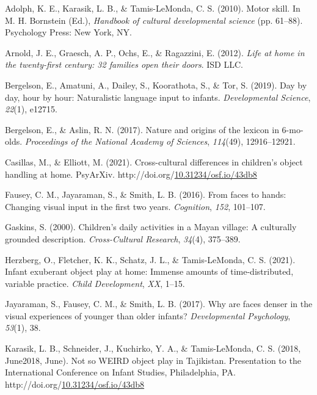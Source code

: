 \documentclass[10pt, letterpaper]{article}
\newenvironment{CSLReferences}%
  {}%
  {\par}
\begin{document}
\noindent

\hypertarget{refs}{}
\begin{CSLReferences}{1}{0}
\leavevmode\hypertarget{ref-adolph2010motor}{}%
Adolph, K. E., Karasik, L. B., \& Tamis-LeMonda, C. S. (2010). Motor
skill. In M. H. Bornstein (Ed.), \emph{Handbook of cultural
developmental science} (pp. 61--88). Psychology Press: New York, NY.

\leavevmode\hypertarget{ref-arnold2012life}{}%
Arnold, J. E., Graesch, A. P., Ochs, E., \& Ragazzini, E. (2012).
\emph{Life at home in the twenty-first century: 32 families open their
doors}. ISD LLC.

\leavevmode\hypertarget{ref-bergelson2019day}{}%
Bergelson, E., Amatuni, A., Dailey, S., Koorathota, S., \& Tor, S.
(2019). Day by day, hour by hour: Naturalistic language input to
infants. \emph{Developmental Science}, \emph{22}(1), e12715.

\leavevmode\hypertarget{ref-bergelson2017nature}{}%
Bergelson, E., \& Aslin, R. N. (2017). Nature and origins of the lexicon
in 6-mo-olds. \emph{Proceedings of the National Academy of Sciences},
\emph{114}(49), 12916--12921.

\leavevmode\hypertarget{ref-casillasURdaylong}{}%
Casillas, M., \& Elliott, M. (2021). Cross-cultural differences in
children's object handling at home. PsyArXiv.
http://doi.org/\href{https://doi.org/10.31234/osf.io/43db8}{10.31234/osf.io/43db8}

\leavevmode\hypertarget{ref-fausey2016faces}{}%
Fausey, C. M., Jayaraman, S., \& Smith, L. B. (2016). From faces to
hands: Changing visual input in the first two years. \emph{Cognition},
\emph{152}, 101--107.

\leavevmode\hypertarget{ref-gaskins2000childrens}{}%
Gaskins, S. (2000). Children's daily activities in a {M}ayan village: A
culturally grounded description. \emph{Cross-Cultural Research},
\emph{34}(4), 375--389.

\leavevmode\hypertarget{ref-herzberg2021exuberant}{}%
Herzberg, O., Fletcher, K. K., Schatz, J. L., \& Tamis-LeMonda, C. S.
(2021). Infant exuberant object play at home: Immense amounts of
time-distributed, variable practice. \emph{Child Development},
\emph{XX}, 1--15.

\leavevmode\hypertarget{ref-jayaraman2017faces}{}%
Jayaraman, S., Fausey, C. M., \& Smith, L. B. (2017). Why are faces
denser in the visual experiences of younger than older infants?
\emph{Developmental Psychology}, \emph{53}(1), 38.

\leavevmode\hypertarget{ref-karasik2018not}{}%
Karasik, L. B., Schneider, J., Kuchirko, Y. A., \& Tamis-LeMonda, C. S.
(2018, June2018, June). Not so {WEIRD} object play in {T}ajikistan.
Presentation to the International Conference on Infant Studies,
Philadelphia, PA.
http://doi.org/\href{https://doi.org/10.31234/osf.io/43db8}{10.31234/osf.io/43db8}


\end{CSLReferences}
\end{document}
